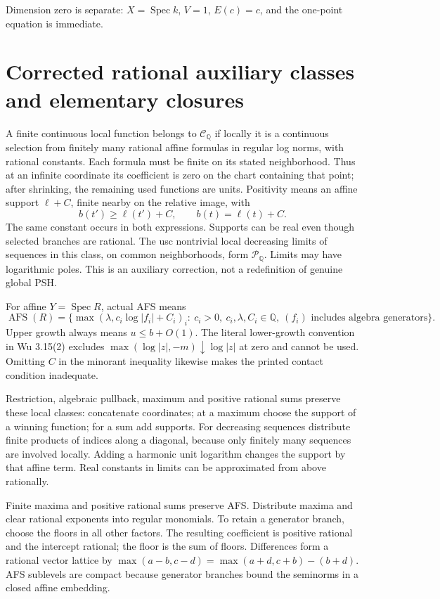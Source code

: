 \documentclass[
  10pt,
]{article}
\begin{document}
Dimension zero is separate: \(X=\operatorname{Spec}k\), \(V=1\),
\(E(c)=c\), and the one-point equation is immediate.

\section{Corrected rational auxiliary classes and elementary
closures}\label{corrected-rational-auxiliary-classes-and-elementary-closures}

A finite continuous local function belongs to \(\mathcal C_{\mathbb Q}\)
if locally it is a continuous selection from finitely many rational
affine formulas in regular log norms, with rational constants. Each
formula must be finite on its stated neighborhood. Thus at an infinite
coordinate its coefficient is zero on the chart containing that point;
after shrinking, the remaining used functions are units. Positivity
means an affine support \(\ell+C\), finite nearby on the relative image,
with \[b(t')\ge\ell(t')+C,\qquad b(t)=\ell(t)+C. \tag{9}\] The same
constant occurs in both expressions. Supports can be real even though
selected branches are rational. The usc nontrivial local decreasing
limits of sequences in this class, on common neighborhoods, form
\(\mathcal P_{\mathbb Q}\). Limits may have logarithmic poles. This is
an auxiliary correction, not a redefinition of genuine global PSH.

For affine \(Y=\operatorname{Spec}R\), actual AFS means
\[\operatorname{AFS}(R)=\{\max(\lambda,c_i\log|f_i|+C_i)_i:\ c_i>0,\ c_i,\lambda,C_i\in\mathbb Q,\ (f_i)\text{ includes algebra generators}\}.\]
Upper growth always means \(u\le b+O(1)\). The literal lower-growth
convention in Wu 3.15(2) excludes \(\max(\log|z|,-m)\downarrow\log|z|\)
at zero and cannot be used. Omitting \(C\) in the minorant inequality
likewise makes the printed contact condition inadequate.

Restriction, algebraic pullback, maximum and positive rational sums
preserve these local classes: concatenate coordinates; at a maximum
choose the support of a winning function; for a sum add supports. For
decreasing sequences distribute finite products of indices along a
diagonal, because only finitely many sequences are involved locally.
Adding a harmonic unit logarithm changes the support by that affine
term. Real constants in limits can be approximated from above
rationally.

Finite maxima and positive rational sums preserve AFS. Distribute maxima
and clear rational exponents into regular monomials. To retain a
generator branch, choose the floors in all other factors. The resulting
coefficient is positive rational and the intercept rational; the floor
is the sum of floors. Differences form a rational vector lattice by
\(\max(a-b,c-d)=\max(a+d,c+b)-(b+d)\). AFS sublevels are compact because
generator branches bound the seminorms in a closed affine embedding.
\end{document}
